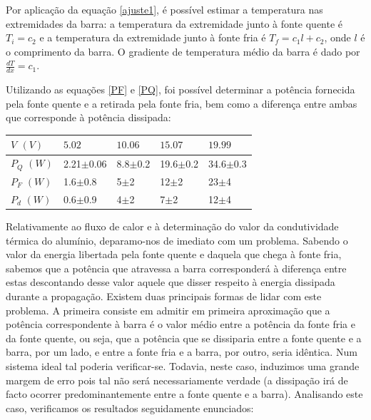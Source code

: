\documentclass[8pt]{extarticle}
\begin{document}
\begin{multicols}{2}
\par Por aplicação da equação \eqref{ajuste1}, é possível estimar a temperatura nas extremidades da barra: a temperatura da extremidade junto à fonte quente é $T_i=c_2$ e a temperatura da extremidade junto à fonte fria é $T_f=c_1l+c_2$, onde $l$ é o comprimento da barra. O gradiente de temperatura médio da barra é dado por $\frac{dT}{dx}=c_1$.

\par Utilizando as equações \eqref{PF} e \eqref{PQ}, foi possível determinar a potência fornecida pela fonte quente e a retirada pela fonte fria, bem como a diferença entre ambas que corresponde à potência dissipada:

{\small
\begin{center}
\begin{tabular}{ x{1.2cm} x{1.3cm} x{1.3cm} x{1.3cm} x{1.3cm} } 
$V$ $(V)$ & $5.02$ & $10.06$ & $15.07$ & $19.99$ \tabularnewline
\hline \hline
$P_Q$ $(W)$ & 2.21$\pm$0.06 & 8.8$\pm$0.2 & 19.6$\pm$0.2 & 34.6$\pm$0.3 \tabularnewline
$P_F$ $(W)$ & 1.6$\pm$0.8   & 5$\pm$2     & 12$\pm$2 & 23$\pm$4 \tabularnewline
$P_d$ $(W)$ & 0.6$\pm$0.9   & 4$\pm$2     & 7$\pm$2  &
12$\pm$4 \tabularnewline
\end{tabular}
\par{}
\end{center}
}

\par Relativamente ao fluxo de calor e à determinação do valor da condutividade térmica do alumínio, deparamo-nos de imediato com um problema. Sabendo o valor da energia libertada pela fonte quente e daquela que chega à fonte fria, sabemos que a potência que atravessa a barra corresponderá à diferença entre estas descontando desse valor aquele que disser respeito à energia dissipada durante a propagação. Existem duas principais formas de lidar com este problema. A primeira consiste em admitir em primeira aproximação que a potência correspondente à barra é o valor médio entre a potência da fonte fria e da fonte quente, ou seja, que a potência que se dissiparia entre a fonte quente e a barra, por um lado, e entre a fonte fria e a barra, por outro, seria idêntica. Num sistema ideal tal poderia verificar-se. Todavia, neste caso, induzimos uma grande margem de erro pois tal não será necessariamente verdade (a dissipação irá de facto ocorrer predominantemente entre a fonte quente e a barra). Analisando este caso, verificamos os resultados seguidamente enunciados:


\end{multicols}
\end{document}
